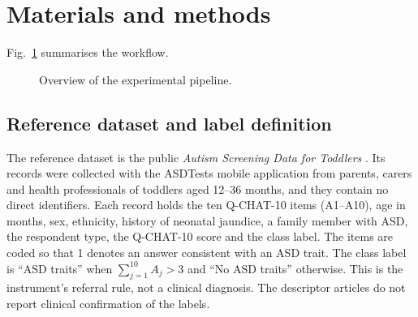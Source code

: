\documentclass[5p,times,twocolumn]{elsarticle}
\begin{document}
\section{Materials and methods}
\label{sec:methods}

Fig.~\ref{fig:pipeline} summarises the workflow.

\begin{figure}[t]
\centering
{}
\caption{Overview of the experimental pipeline.}
\label{fig:pipeline}
\end{figure}

\subsection{Reference dataset and label definition}
\label{sec:data}

The reference dataset is the public \emph{Autism Screening Data for Toddlers} \cite{thabtah2019}. Its records were collected with the ASDTests mobile application from parents, carers and health professionals of toddlers aged 12--36 months, and they contain no direct identifiers. Each record holds the ten Q-CHAT-10 items (A1--A10), age in months, sex, ethnicity, history of neonatal jaundice, a family member with ASD, the respondent type, the Q-CHAT-10 score and the class label. The items are coded so that 1 denotes an answer consistent with an ASD trait. The class label is ``ASD traits'' when $\sum_{j=1}^{10}A_j>3$ and ``No ASD traits'' otherwise. This is the instrument's referral rule, not a clinical diagnosis. The descriptor articles \cite{thabtah2019} do not report clinical confirmation of the labels.
\end{document}
